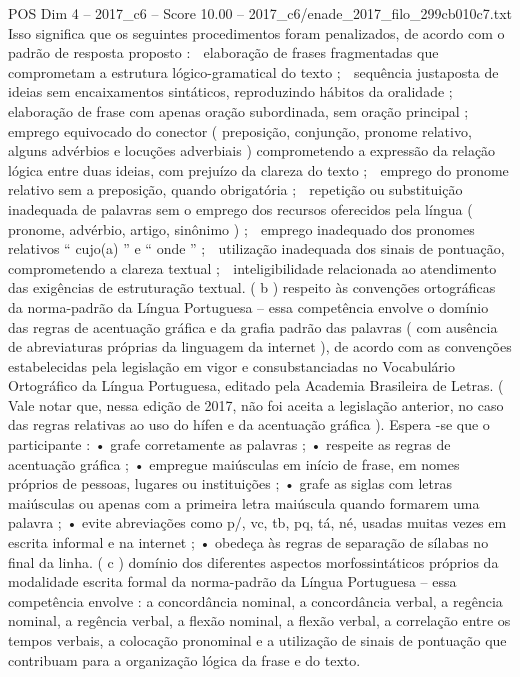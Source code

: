 \begin{textsample}{POS Dim 4 – 2017\_c6 – Score 10.00 – 2017\_c6/enade\_2017\_filo\_299cb010c7.txt}
Isso significa que os seguintes procedimentos foram penalizados, de acordo com o padrão de resposta proposto :  elaboração de frases fragmentadas que comprometam a estrutura lógico-gramatical do texto ;  sequência justaposta de ideias sem encaixamentos sintáticos, reproduzindo hábitos da oralidade ;  elaboração de frase com apenas oração subordinada, sem oração principal ;  emprego equivocado do conector ( preposição, conjunção, pronome relativo, alguns advérbios e locuções adverbiais ) comprometendo a expressão da relação lógica entre duas ideias, com prejuízo da clareza do texto ;  emprego do pronome relativo sem a preposição, quando obrigatória ;  repetição ou substituição inadequada de palavras sem o emprego dos recursos oferecidos pela língua ( pronome, advérbio, artigo, sinônimo ) ;  emprego inadequado dos pronomes relativos “ cujo(a) ” e “ onde ” ;  utilização inadequada dos sinais de pontuação, comprometendo a clareza textual ;  inteligibilidade relacionada ao atendimento das exigências de estruturação textual. ( b ) respeito às convenções ortográficas da norma-padrão da Língua Portuguesa – essa competência envolve o domínio das regras de acentuação gráfica e da grafia padrão das palavras ( com ausência de abreviaturas próprias da linguagem da internet ), de acordo com as convenções estabelecidas pela legislação em vigor e consubstanciadas no Vocabulário Ortográfico da Língua Portuguesa, editado pela Academia Brasileira de Letras. ( Vale notar que, nessa edição de 2017, não foi aceita a legislação anterior, no caso das regras relativas ao uso do hífen e da acentuação gráfica ).
Espera -se que o participante : • grafe corretamente as palavras ; • respeite as regras de acentuação gráfica ; • empregue maiúsculas em início de frase, em nomes próprios de pessoas, lugares ou instituições ; • grafe as siglas com letras maiúsculas ou apenas com a primeira letra maiúscula quando formarem uma palavra ; • evite abreviações como p/, vc, tb, pq, tá, né, usadas muitas vezes em escrita informal e na internet ; • obedeça às regras de separação de sílabas no final da linha. ( c ) domínio dos diferentes aspectos morfossintáticos próprios da modalidade escrita formal da norma-padrão da Língua Portuguesa – essa competência envolve : a concordância nominal, a concordância verbal, a regência nominal, a regência verbal, a flexão nominal, a flexão verbal, a correlação entre os tempos verbais, a colocação pronominal e a utilização de sinais de pontuação que contribuam para a organização lógica da frase e do texto.

\end{textsample}
